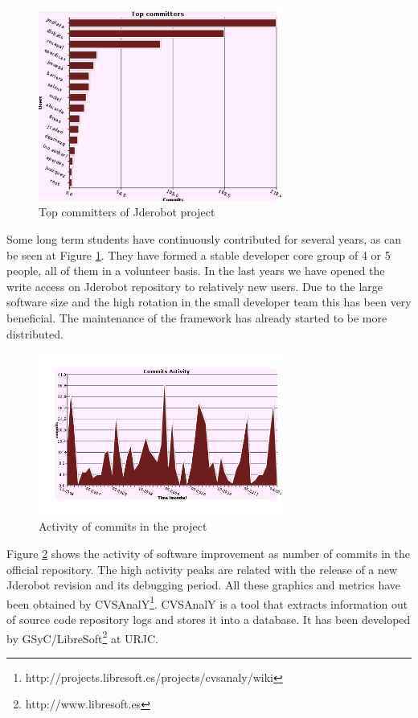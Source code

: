 \documentclass[twocolumn]{svjour3}          %
\begin{document}
\begin{figure}
\begin{center}
  \includegraphics[width=8cm]{svn_top-committers.png}
\caption{Top committers of Jderobot project}
\end{center}
\label{fig:svn-topcommiters}
\end{figure}

Some long term students have continuously contributed for several years, as can be seen at Figure \ref{fig:svn-topcommiters}. They have formed a stable developer core group of 4 or 5 people, all of them in a volunteer basis. In the last years we have opened the write access on Jderobot repository to relatively new users. Due to the large software size and the high rotation in the small developer team this has been very beneficial. The maintenance of the framework has already started to be more distributed.

\begin{figure}
\begin{center}
  \includegraphics[width=8cm]{svn_activity.png}
\caption{Activity of commits in the project}
\end{center}
\label{fig:svn-activity}
\end{figure}

Figure \ref{fig:svn-activity} shows the activity of software improvement as number of commits in the official repository. The high activity peaks are related with the release of a new Jderobot revision and its debugging period. All these graphics and metrics have been obtained by CVSAnalY\footnote{http://projects.libresoft.es/projects/cvsanaly/wiki}. CVSAnalY is a tool that extracts information out of source code repository logs and stores it into a database. It has been developed by GSyC/LibreSoft\footnote{http://www.libresoft.es} at URJC.
\end{document}
